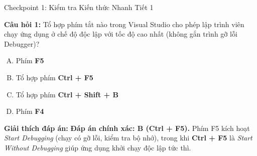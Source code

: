 \documentclass[aspectratio=169, 10pt]{beamer}
\begin{document}
\begin{frame}{Checkpoint 1: Kiểm tra Kiến thức Nhanh Tiết 1}
  \begin{alertblock}{\textbf{Câu hỏi 1:}}
    Tổ hợp phím tắt nào trong Visual Studio cho phép lập trình viên chạy ứng dụng ở chế độ độc lập với tốc độ cao nhất (không gắn trình gỡ lỗi Debugger)?
    \begin{enumerate}[(A)]
      \item Phím \textbf{F5}
      \item Tổ hợp phím \textbf{Ctrl + F5}
      \item Tổ hợp phím \textbf{Ctrl + Shift + B}
      \item Phím \textbf{F4}
    \end{enumerate}
  \end{alertblock}
  \pause
  \begin{exampleblock}{\textbf{Giải thích đáp án:}}
    \textbf{Đáp án chính xác: B (Ctrl + F5).} Phím F5 kích hoạt \textit{Start Debugging} (chạy có gỡ lỗi, kiểm tra bộ nhớ), trong khi \textbf{Ctrl + F5} là \textit{Start Without Debugging} giúp ứng dụng khởi chạy độc lập tức thì.
  \end{exampleblock}
\end{frame}
\end{document}

